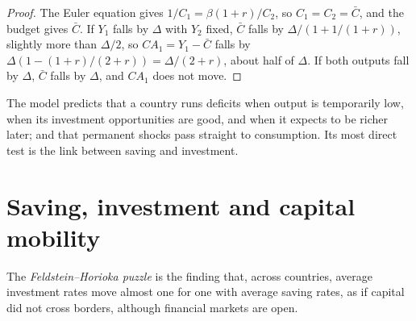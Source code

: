 \begin{proof}
The Euler equation gives $1/C_1 = \beta(1 + r)/C_2$, so $C_1 = C_2 = \bar C$, and the budget
gives $\bar C$. If $Y_1$ falls by $\Delta$ with $Y_2$ fixed, $\bar C$ falls by $\Delta/(1 + 1/(1 + r))$,
slightly more than $\Delta/2$, so $CA_1 = Y_1 - \bar C$ falls by $\Delta(1 - (1 + r)/(2 + r)) = \Delta/(2 + r)$,
about half of $\Delta$. If both outputs fall by $\Delta$, $\bar C$ falls by $\Delta$, and $CA_1$ does not move.
\end{proof}

\begin{omfigure}
\par{}
\end{omfigure}

The model predicts that a country runs deficits when output is temporarily low,
when its investment opportunities are good, and when it expects to be richer
later; and that permanent shocks pass straight to consumption. Its most direct
test is the link between saving and investment.

\section{Saving, investment and capital mobility}\label{sec:b3:current-account:fh}

\begin{definition}\label{def:b3:current-account:feldstein-horioka}
The \emph{Feldstein--Horioka puzzle} is the finding that, across countries, average
investment rates move almost one for one with average saving rates, as if capital
did not cross borders, although financial markets are open.
\end{definition}

